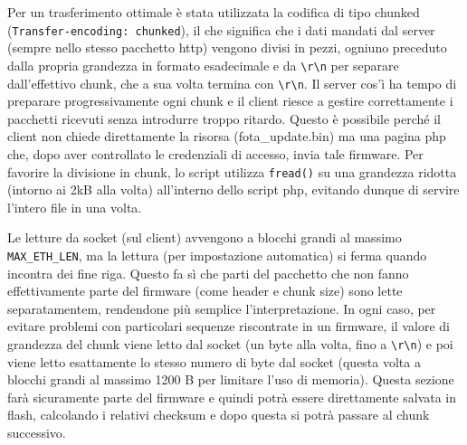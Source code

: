 Per un trasferimento ottimale \`e stata utilizzata la codifica di tipo chunked (\texttt{Transfer-encoding: chunked}), il che significa che i dati mandati dal server (sempre nello stesso pacchetto http) vengono divisi in pezzi, ogniuno preceduto dalla propria grandezza in formato esadecimale e da \texttt{\textbackslash{r}\textbackslash{n}} per separare dall'effettivo chunk, che a sua volta termina con \texttt{\textbackslash{r}\textbackslash{n}}. Il server cos'\`i ha tempo di preparare progressivamente ogni chunk e il client riesce a gestire correttamente i pacchetti ricevuti senza introdurre troppo ritardo. Questo \`e possibile perch\'e il client non chiede direttamente la risorsa (fota\_update.bin) ma una pagina php che, dopo aver controllato le credenziali di accesso, invia tale firmware. Per favorire la divisione in chunk, lo script utilizza \texttt{fread()} su una grandezza ridotta (intorno ai 2kB alla volta) all'interno dello script php, evitando dunque di servire l'intero file in una volta.

Le letture da socket (sul client) avvengono a blocchi grandi al massimo \texttt{MAX\_ETH\_LEN}, ma la lettura (per impostazione automatica) si ferma quando incontra dei fine riga. Questo fa s\`i che parti del pacchetto che non fanno effettivamente parte del firmware (come header e chunk size) sono lette separatamentem, rendendone pi\`u semplice l'interpretazione. In ogni caso, per evitare problemi con particolari sequenze riscontrate in un firmware, il valore di grandezza del chunk viene letto dal socket (un byte alla volta, fino a \texttt{\textbackslash{r}\textbackslash{n}}) e poi viene letto esattamente lo stesso numero di byte dal socket (questa volta a blocchi grandi al massimo 1200 B per limitare l'uso di memoria). Questa sezione far\`a sicuramente parte del firmware e quindi potr\`a essere direttamente salvata in flash, calcolando i relativi checksum e dopo questa si potr\`a passare al chunk successivo.

